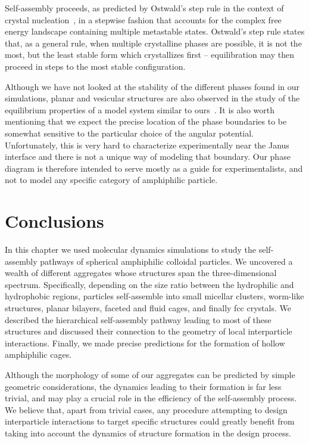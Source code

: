 Self-assembly proceeds, as predicted by Ostwald's step rule in the context of crystal nucleation~\cite{ostwald}, in a stepwise fashion that accounts for the  complex free energy landscape containing  multiple metastable states.
Ostwald's step rule states that, as a general rule, when multiple crystalline phases are possible, it is not the most, but the least stable form which crystallizes first -- equilibration may then proceed in steps to the most stable configuration.

Although we have not looked at the stability of the different phases found in our simulations, planar and vesicular structures are also observed in the study of the equilibrium properties of a model system similar to ours~\cite{SciortinoX}.
It is also worth mentioning that we expect the precise location of the phase boundaries to be somewhat sensitive to the particular choice of the angular potential. 
Unfortunately, this is very hard to characterize experimentally near the Janus interface and there is not a unique way of modeling that boundary.
Our phase diagram is therefore intended to serve mostly as a guide for experimentalists, and not to model any specific category of amphiphilic particle.

\section{Conclusions}
In this chapter we used molecular dynamics simulations to study the self-assembly pathways of spherical  amphiphilic colloidal particles.
We uncovered a wealth of different aggregates whose structures  span the three-dimensional spectrum.
Specifically, depending on the size ratio between the hydrophilic and  hydrophobic regions, particles self-assemble into small micellar clusters, worm-like structures, planar bilayers, faceted and fluid cages, and finally fcc crystals.
We described  the hierarchical self-assembly pathway leading to most of these structures and discussed their connection to the geometry of local interparticle interactions.
Finally, we made precise predictions  for the formation of hollow amphiphilic cages.

Although the morphology  of some of our aggregates can be predicted by simple geometric considerations, the dynamics leading to their formation is far less trivial, and may play a crucial role in the efficiency of the self-assembly process.
We believe that, apart from trivial cases, any procedure attempting to design interparticle interactions to target specific structures could greatly benefit from taking into account the dynamics of structure formation in the design process.
